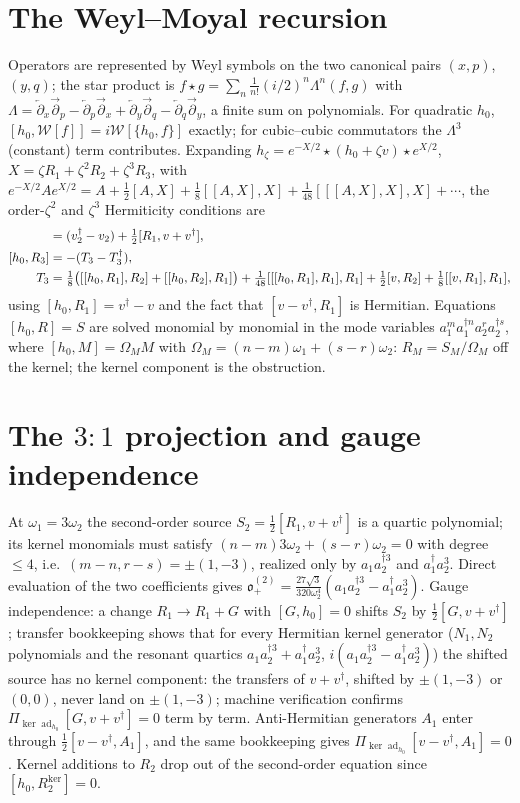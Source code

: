 \documentclass[11pt]{article}
\theoremstyle{definition}
\theoremstyle{remark}
\newcommand{\w}{\omega}
\newcommand{\dg}{\dagger}
\newcommand{\ad}{\operatorname{ad}}
\newcommand{\ob}{\mathfrak o}
\newcommand{\kerad}{\Pi_{\ker\ad_{h_0}}}
\begin{document}
\appendix

\section{The Weyl--Moyal recursion}\label{app:recursion}

Operators are represented by Weyl symbols on the two canonical pairs
$(x,p)$, $(y,q)$; the star product is
$f\star g=\sum_n\frac1{n!}(i/2)^n\Lambda^n(f,g)$ with
$\Lambda=\overleftarrow\partial_x\overrightarrow\partial_p
-\overleftarrow\partial_p\overrightarrow\partial_x
+\overleftarrow\partial_y\overrightarrow\partial_q
-\overleftarrow\partial_q\overrightarrow\partial_y$, a finite sum on
polynomials.  For quadratic $h_0$,
$[h_0,\mathcal W[f]]=i\mathcal W[\{h_0,f\}]$ exactly; for cubic--cubic
commutators the $\Lambda^3$ (constant) term contributes.  Expanding
$h_\zeta=e^{-X/2}\star(h_0+\zeta v)\star e^{X/2}$,
$X=\zeta R_1+\zeta^2R_2+\zeta^3R_3$, with
$e^{-X/2}Ae^{X/2}=A+\tfrac12[A,X]+\tfrac18[[A,X],X]
+\tfrac1{48}[[[A,X],X],X]+\cdots$, the order-$\zeta^2$ and
$\zeta^3$ Hermiticity conditions are
\begin{align}
[h_0,R_2]&=(v_2^{\dg}-v_2)+\tfrac12[R_1,v+v^{\dg}],\\
[h_0,R_3]&=-(T_3-T_3^{\dg}),\\
T_3&=\tfrac18\big([[h_0,R_1],R_2]+[[h_0,R_2],R_1]\big)
+\tfrac1{48}[[[h_0,R_1],R_1],R_1]
+\tfrac12[v,R_2]+\tfrac18[[v,R_1],R_1],\notag
\end{align}
using $[h_0,R_1]=v^{\dg}-v$ and the fact that
$[v-v^{\dg},R_1]$ is Hermitian.  Equations $[h_0,R]=S$ are solved
monomial by monomial in the mode variables
$a_1^{m}a_1^{\dg n}a_2^{r}a_2^{\dg s}$, where
$[h_0,M]=\Omega_MM$ with
$\Omega_M=(n-m)\w_1+(s-r)\w_2$: $R_M=S_M/\Omega_M$ off the kernel;
the kernel component is the obstruction.

\section{The $3{:}1$ projection and gauge independence}
\label{app:threeone}

At $\w_1=3\w_2$ the second-order source
$S_2=\tfrac12[R_1,v+v^{\dg}]$ is a quartic polynomial; its kernel
monomials must satisfy $(n-m)3\w_2+(s-r)\w_2=0$ with degree $\le4$,
i.e.\ $(m-n,r-s)=\pm(1,-3)$, realized only by
$a_1a_2^{\dg3}$ and $a_1^{\dg}a_2^3$.  Direct evaluation of the two
coefficients gives
$\ob_+^{(2)}=\tfrac{27\sqrt3}{320\w_2^4}(a_1a_2^{\dg3}-a_1^{\dg}a_2^3)$.
Gauge independence: a change $R_1\to R_1+G$ with $[G,h_0]=0$ shifts
$S_2$ by $\tfrac12[G,v+v^{\dg}]$; transfer bookkeeping shows that for
every Hermitian kernel generator ($N_1,N_2$ polynomials and the
resonant quartics $a_1a_2^{\dg3}+a_1^{\dg}a_2^3$,
$i(a_1a_2^{\dg3}-a_1^{\dg}a_2^3)$) the shifted source has no kernel
component: the transfers of $v+v^{\dg}$, shifted by $\pm(1,-3)$ or
$(0,0)$, never land on $\pm(1,-3)$; machine verification confirms
$\kerad[G,v+v^{\dg}]=0$ term by term.  Anti-Hermitian generators $A_1$
enter through $\tfrac12[v-v^{\dg},A_1]$, and the same bookkeeping gives
$\kerad[v-v^{\dg},A_1]=0$.  Kernel additions to $R_2$ drop out of the
second-order equation since $[h_0,R_2^{\ker}]=0$.
\end{document}
